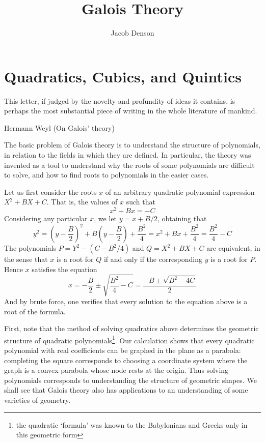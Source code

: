 

\title{Galois Theory}
\author{Jacob Denson}



\maketitle
\tableofcontents

\chapter{Quadratics, Cubics, and Quintics}


\epigraph{This letter, if judged by the novelty and profundity of ideas it contains, is perhaps the most substantial piece of writing in the whole literature of mankind.}{Hermann Weyl (On Galois' theory)}

The basic problem of Galois theory is to understand the structure of polynomials, in relation to the fields in which they are defined. In particular, the theory was invented as a tool to understand why the roots of some polynomials are difficult to solve, and how to find roots to polynomials in the easier cases.

Let us first consider the roots $x$ of an arbitrary quadratic polynomial expression $X^2 + BX + C$. That is, the values of $x$ such that
%
\begin{equation} x^2 + Bx = -C \end{equation}
%
Considering any particular $x$, we let $y = x + B/2$, obtaining that
%
\[ y^2 = \left(y - \frac{B}{2} \right)^2 + B \left( y - \frac{B}{2} \right) + \frac{B^2}{4} = x^2 + Bx + \frac{B^2}{4} = \frac{B^2}{4} - C \]
%
The polynomials $P = Y^2 - (C - B^2/4)$ and $Q = X^2 + BX + C$ are equivalent, in the sense that $x$ is a root for $Q$ if and only if the corresponding $y$ is a root for $P$. Hence $x$ satisfies the equation
%
\[ x = -\frac{B}{2} \pm \sqrt{\frac{B^2}{4} - C} = \frac{-B \pm \sqrt{B^2 - 4C}}{2} \]
%
And by brute force, one verifies that every solution to the equation above is a root of the formula.

First, note that the method of solving quadratics above determines the geometric structure of quadratic polynomials\footnote{the quadratic `formula' was known to the Babylonians and Greeks only in this geometric form}. Our calculation shows that every quadratic polynomial with real coefficients can be graphed in the plane as a parabola: completing the square corresponds to choosing a coordinate system where the graph is a convex parabola whose node rests at the origin. Thus solving polynomials corresponds to understanding the structure of geometric shapes. We shall see that Galois theory also has applications to an understanding of some varieties of geometry.

